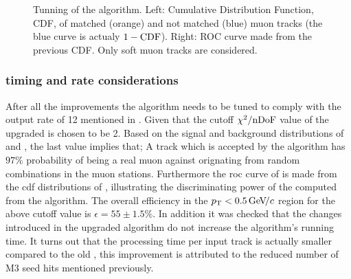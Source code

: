 \begin{figure}[t]
  \centering
  \begin{subfigure}{0.5\textwidth}
    \raggedright
    \scalebox{0.6}{}
    \caption{}
    \label{mvm_cdf}
  \end{subfigure}%
  \hfill%
  \begin{subfigure}{0.5\textwidth}
    \raggedleft
    \scalebox{0.6}{}
    \caption{}
    \label{mvm_roc}
  \end{subfigure}
  \caption{Tunning of the \mvTTm algorithm. Left: \chisq Cumulative Distribution Function, CDF,
           of matched (orange) and not matched (blue) muon tracks (the blue curve is actualy $1-{\rm CDF}$).
           Right: ROC curve made from the previous \chisq CDF. Only soft muon tracks are considered. }
 \label{mvm_tuning}
\end{figure}

\subsubsection{\hltone timing and rate considerations}
After all the improvements the \mvTTm algorithm needs to be tuned to comply with the \hltone output rate of 12
\khz mentioned in . Given that the cutoff $\chi^2/\rm nDoF$ value of the upgraded \mvTTm is chosen to be 2.
Based on the signal and background distributions of  and , the last value implies that;
A \velo track which is accepted by the \mvTTm algorithm has $97\%$ probability of being a real muon against orignating from
random combinations in the muon stations.
Furthermore the roc curve of  is made from the cdf distributions of , illustrating
the discriminating power of the \chisq computed from the \mvTTm algorithm.
The overall \mvTTm efficiency in the $\mbox{$p_{\rm T}$}<0.5{\mathrm{\,Ge\kern -0.1em V\!/}c}$ region for the above cutoff value is $\epsilon = 55 \pm 1.5 \%$.
In addition it was checked that the changes introduced in the upgraded \mvTTm algorithm
do not increase the algorithm's running time. It turns out that the processing time per input track is actually
smaller compared to the old \mvm, this improvement is attributed to the reduced number of M3 seed hits mentioned previously.

